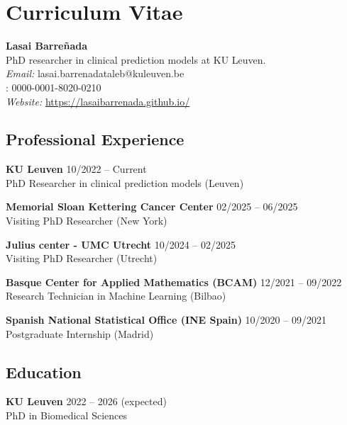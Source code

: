 \chapter*{Curriculum Vitae}

\noindent
\textbf{Lasai Barreñada} \\
PhD researcher in clinical prediction models at KU Leuven. \\
\textit{Email:} lasai.barrenadataleb@kuleuven.be \\
: 0000-0001-8020-0210 \\
\textit{Website:} \url{https://lasaibarrenada.github.io/}
\section*{Professional Experience}

\noindent
\textbf{KU Leuven} \hfill 10/2022 -- Current \\
PhD Researcher in clinical prediction models (Leuven)

\vspace{0.5em} \noindent
\textbf{Memorial Sloan Kettering Cancer Center} \hfill 02/2025 -- 06/2025 \\
Visiting PhD Researcher (New York)

\vspace{0.5em} \noindent
\textbf{Julius center - UMC Utrecht} \hfill 10/2024 -- 02/2025 \\
Visiting PhD Researcher (Utrecht)

\vspace{0.5em} \noindent
\textbf{Basque Center for Applied Mathematics (BCAM)} \hfill 12/2021 -- 09/2022 \\
Research Technician in Machine Learning (Bilbao)

\vspace{0.5em} \noindent
\textbf{Spanish National Statistical Office (INE Spain)} \hfill 10/2020 -- 09/2021 \\
Postgraduate Internship (Madrid)

\section*{Education}

\noindent
\textbf{KU Leuven} \hfill 2022 -- 2026 (expected) \\
PhD in Biomedical Sciences

